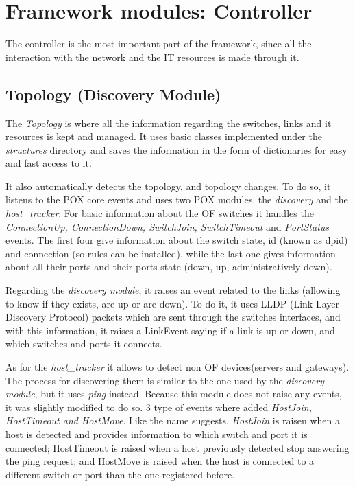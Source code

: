 \documentclass[12pt,english,oneside]{book}
\begin{document}
\newpage

\section{Framework modules: Controller}
\hspace{0.6cm}

The controller is the most important part of the framework, since all the interaction with the network and the IT resources is made through it.

\subsection{Topology (Discovery Module)}
\hspace{0.6cm}

The \textit{Topology} is where all the information regarding the switches, links and it resources is kept and managed. It uses basic classes implemented under the \textit{structures} directory and saves the information in the form of dictionaries for easy and fast access to it.

It also automatically detects the topology, and topology changes. To do so, it listens to the POX core events and uses two POX modules, the \textit{discovery} and the \textit{host\_tracker}.
For basic information about the OF switches it handles the \textit{ConnectionUp, ConnectionDown, SwitchJoin, SwitchTimeout} and \textit{PortStatus} events.
The first four give information about the switch state, id (known as dpid) and connection (so rules can be installed), while the last one gives information about all their ports and their ports state (down, up, administratively down).

Regarding the \textit{discovery module}, it raises an event related to the links (allowing to know if they exists, are up or are down). To do it, it uses LLDP (Link Layer Discovery Protocol) packets which are sent through the switches interfaces, and with this information, it raises a LinkEvent saying if a link is up or down, and which switches and ports it connects.

As for the \textit{host\_tracker} it allows to detect non OF devices(servers and gateways). The process for discovering them is similar to the one used by the \textit{discovery module}, but it uses \textit{ping} instead.
Because this module does not raise any events, it was slightly modified to do so.
$3$ type of events where added \textit{HostJoin, HostTimeout and HostMove}. Like the name suggests, \textit{HostJoin} is raisen when a host is detected and provides information to which switch and port it is connected; HostTimeout is raised when a host previously detected stop answering the ping request; and HostMove is raised when the host is connected to a different switch or port than the one registered before.
\end{document}
